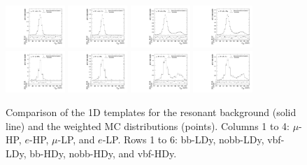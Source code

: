 \begin{figure}[htbp]
  \includegraphics[width=0.2\textwidth]{fig/2Dfit/templateVsReco_res_r0_MJ_mu_HP_nobb_HDy.pdf}
  \includegraphics[width=0.2\textwidth]{fig/2Dfit/templateVsReco_res_r0_MJ_e_HP_nobb_HDy.pdf}
  \includegraphics[width=0.2\textwidth]{fig/2Dfit/templateVsReco_res_r0_MJ_mu_LP_nobb_HDy.pdf}
  \includegraphics[width=0.2\textwidth]{fig/2Dfit/templateVsReco_res_r0_MJ_e_LP_nobb_HDy.pdf}\\
  \includegraphics[width=0.2\textwidth]{fig/2Dfit/templateVsReco_res_r0_MJ_mu_HP_vbf_HDy.pdf}
  \includegraphics[width=0.2\textwidth]{fig/2Dfit/templateVsReco_res_r0_MJ_e_HP_vbf_HDy.pdf}
  \includegraphics[width=0.2\textwidth]{fig/2Dfit/templateVsReco_res_r0_MJ_mu_LP_vbf_HDy.pdf}
  \includegraphics[width=0.2\textwidth]{fig/2Dfit/templateVsReco_res_r0_MJ_e_LP_vbf_HDy.pdf}\\
  \caption{
    Comparison of the 1D \MJ templates for the resonant background (solid line) and the weighted MC distributions (points).
    Columns 1 to 4: $\mu$-HP, $e$-HP, $\mu$-LP, and $e$-LP.
    Rows 1 to 6: bb-LDy, nobb-LDy, vbf-LDy, bb-HDy, nobb-HDy, and vbf-HDy.
  }
  \label{fig:1dtemplateVsReco_res_MJ_Run2}
\end{figure}

